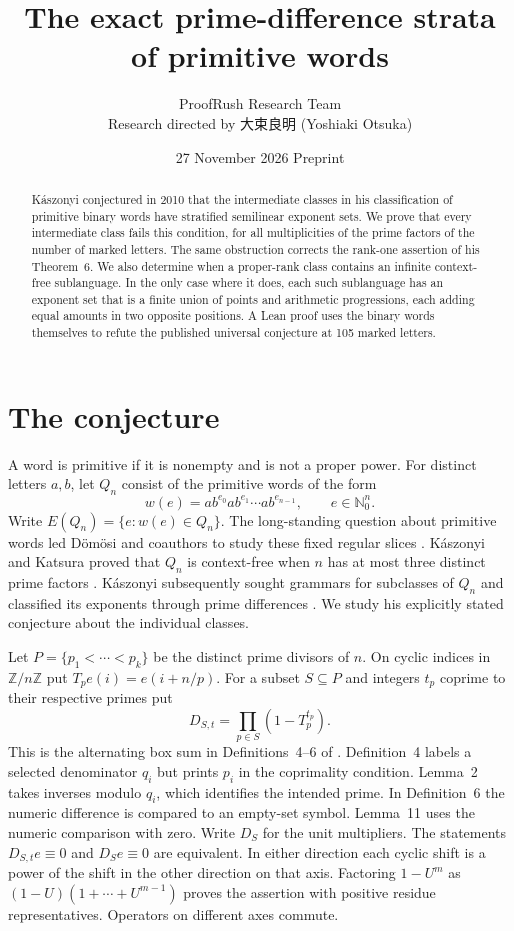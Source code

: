 \documentclass[11pt]{article}
\title{The exact prime-difference strata of primitive words}
\author{ProofRush Research Team\\\small Research directed by {\directorfont 大束良明} (Yoshiaki Otsuka)}
\date{27 November 2026 \qquad Preprint}
\newcommand{\N}{\mathbb N_0}
\newcommand{\Z}{\mathbb Z}
\begin{document}
\maketitle
\begin{abstract}
K\'aszonyi conjectured in 2010 that the intermediate classes in his
classification of primitive binary words have stratified semilinear
exponent sets. We prove that every intermediate class fails this condition,
for all multiplicities of the prime factors of the number of marked
letters. The same obstruction corrects the rank-one assertion of his
Theorem~6. We also determine when a proper-rank class contains an
infinite context-free sublanguage. In the only case where it does, each
such sublanguage has an exponent set that is a finite union of points
and arithmetic progressions, each adding equal amounts in two opposite
positions. A Lean proof uses the binary words themselves to refute the
published universal conjecture at 105 marked letters.
\end{abstract}

\section{The conjecture}
A word is primitive if it is nonempty and is not a proper power. For
distinct letters \(a,b\), let \(Q_n\) consist of the primitive words of
the form
\[
 w(e)=a b^{e_0}a b^{e_1}\cdots a b^{e_{n-1}},\qquad e\in\N^n .
\]
Write \(E(Q_n)=\{e:w(e)\in Q_n\}\). The long-standing question about
primitive words led D\"om\"osi and coauthors to study these fixed
regular slices \cite{domosi}. K\'aszonyi and Katsura proved that
\(Q_n\) is context-free when \(n\) has at most three distinct prime
factors \cite{three}. K\'aszonyi subsequently sought grammars for
subclasses of \(Q_n\) and classified its exponents through prime
differences \cite[pp.~314, 325, 328]{kasonyi}. We study his explicitly
stated conjecture about the individual classes.

Let \(P=\{p_1<\cdots<p_k\}\) be the distinct prime divisors of \(n\).
On cyclic indices in \(\Z/n\Z\) put \(T_p e(i)=e(i+n/p)\). For a
subset \(S\subseteq P\) and integers \(t_p\) coprime to their
respective primes put
\[
  D_{S,t}=\prod_{p\in S}(1-T_p^{t_p}).
\]
This is the alternating box sum in Definitions~4--6 of \cite{kasonyi}.
Definition~4 labels a selected denominator \(q_i\) but prints \(p_i\)
in the coprimality condition. Lemma~2 takes inverses modulo \(q_i\),
which identifies the intended prime. In Definition~6 the numeric
difference is compared to an empty-set symbol. Lemma~11 uses the
numeric comparison with zero.
Write \(D_S\) for the unit multipliers. The statements
\(D_{S,t}e\equiv0\) and \(D_Se\equiv0\) are equivalent. In either
direction each cyclic shift is a power of the shift in the other
direction on that axis. Factoring \(1-U^m\) as
\((1-U)(1+\cdots+U^{m-1})\) proves the assertion with positive
residue representatives. Operators on different axes commute.
\end{document}
